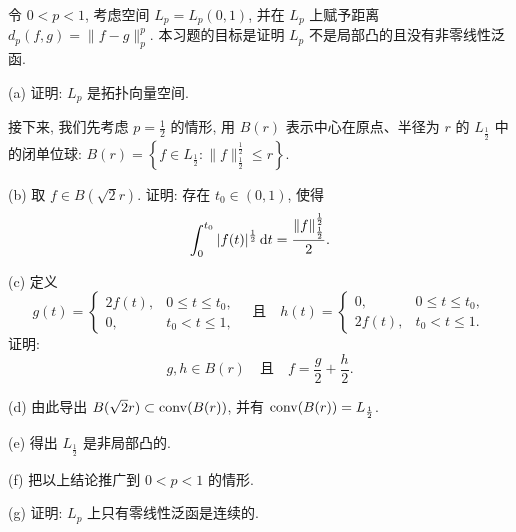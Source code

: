 \setcounter{exer}{15}
\begin{exercise}
    令 $0<p<1$, 考虑空间 $L_p=L_p(0,1)$, 并在 $L_p$ 上赋予距离 $d_{p}(f, g)=\|f-g\|_p^p$. 
    本习题的目标是证明 $L_p$ 不是局部凸的且没有非零线性泛函.

    (a) 证明: $L_p$ 是拓扑向量空间.

    接下来, 我们先考虑 $p=\frac{1}{2}$ 的情形, 用 $B(r)$ 表示中心在原点、半径为 $r$ 的 $L_{\frac{1}{2}}$ 中的闭单位球: 
    $B(r)=\left\{f \in L_{\frac{1}{2}}\colon \|f\|_{\frac{1}{2}}^{\frac{1}{2}} \leqslant r\right\}$.

    (b) 取 $f\in B(\sqrt{2}r)$. 证明: 存在 $t_0 \in(0,1)$, 使得
    \[
    \int_{0}^{t_0}|f(t)|^{\frac{1}{2}}\mathop{}\!\mathrm{d} t=\frac{\|f\|_{\frac{1}{2}}^{\frac{1}{2}}}{2}.
    \]

    (c) 定义
    \[g(t)=
    \begin{cases}
        2f(t), & 0\leqslant t\leqslant t_{0}, \\
        0, & t_{0}<t\leqslant 1,
    \end{cases}\quad\text{且}\quad 
    h(t)=\begin{cases}
        0, & 0 \leqslant t \leqslant t_{0}, \\
        2f(t), & t_{0}<t \leqslant 1.
    \end{cases}\]
    证明:
    \[g, h \in B(r) \quad \text{且} \quad f=\frac{g}{2}+\frac{h}{2}.\]

    (d) 由此导出 $B(\sqrt{2} r)\subset\operatorname{conv}(B(r))$, 并有 $\operatorname{conv}(B(r))=L_{\frac{1}{2}}$.

    (e) 得出 $L_{\frac{1}{2}}$ 是非局部凸的.

    (f) 把以上结论推广到 $0<p<1$ 的情形.

    (g) 证明: $L_{p}$ 上只有零线性泛函是连续的.
\end{exercise}


